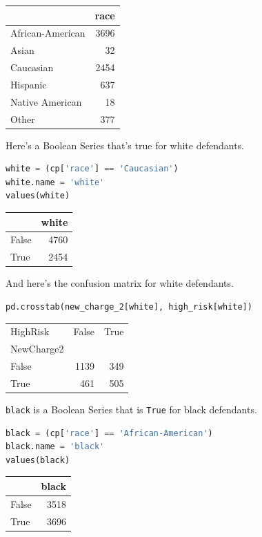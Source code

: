 \begin{tabular}{lr}
\toprule
{} &  race \\
\midrule
African-American &  3696 \\
Asian            &    32 \\
Caucasian        &  2454 \\
Hispanic         &   637 \\
Native American  &    18 \\
Other            &   377 \\
\bottomrule
\end{tabular}

Here's a Boolean Series that's true for white defendants.

\begin{lstlisting}[language=Python,style=source]
white = (cp['race'] == 'Caucasian')
white.name = 'white'
values(white)
\end{lstlisting}

\begin{tabular}{lr}
\toprule
{} &  white \\
\midrule
False &   4760 \\
True  &   2454 \\
\bottomrule
\end{tabular}

And here's the confusion matrix for white defendants.

\begin{lstlisting}[language=Python,style=source]
pd.crosstab(new_charge_2[white], high_risk[white])
\end{lstlisting}

\begin{tabular}{lrr}
\toprule
HighRisk &  False &  True  \\
NewCharge2 &        &        \\
\midrule
False      &   1139 &    349 \\
True       &    461 &    505 \\
\bottomrule
\end{tabular}

\passthrough{\lstinline!black!} is a Boolean Series that is
\passthrough{\lstinline!True!} for black defendants.

\begin{lstlisting}[language=Python,style=source]
black = (cp['race'] == 'African-American')
black.name = 'black'
values(black)
\end{lstlisting}

\begin{tabular}{lr}
\toprule
{} &  black \\
\midrule
False &   3518 \\
True  &   3696 \\
\bottomrule
\end{tabular}


